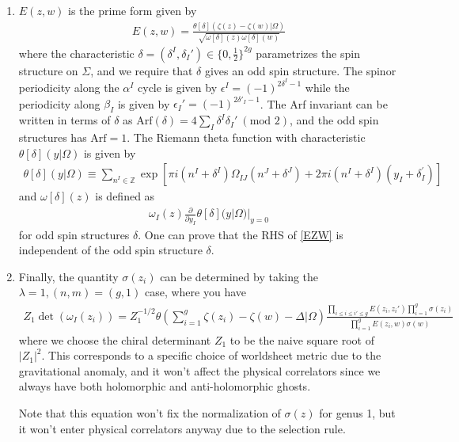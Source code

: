 \documentclass[12pt,letterpaper]{article}
\def\ie{\begin{equation}\begin{aligned}}
\def\fe{\end{aligned}\end{equation}}
\numberwithin{equation}{section}
\begin{document}
\begin{enumerate}
\item[$\bullet$] $E(z,w)$ is the prime form given by
\ie
E(z,w) = \frac{\theta[\delta](\zeta(z)-\zeta(w)|\Omega)}{\sqrt{\omega[\delta](z)\omega[\delta](w)}}
\label{EZW}
\fe
where the characteristic $\delta=(\delta^I, \delta_I')\in \{0,\frac{1}{2}\}^{2g}$ parametrizes the spin structure on $\Sigma$, and we require that $\delta$ gives an odd spin structure. The spinor periodicity along the $\alpha^I$ cycle is given by $\epsilon^I=(-1)^{2\delta^I-1}$ while the periodicity along $\beta_I$ is given by $\epsilon_I'=(-1)^{2\delta'_I-1}$. The Arf invariant can be written in terms of $\delta$ as $\mathrm{Arf}(\delta)=4\sum_{I}\delta^I \delta_I'\ (\text{mod }2)$, and the odd spin structures has $\text{Arf}=1$. The Riemann theta function with characteristic $\theta[\delta](y|\Omega)$ is given by 
\ie
\theta[\delta](y |\Omega) \equiv \sum_{n^I \in \mathbb{Z}} \exp \left[\pi i\left(n^I+\delta^I\right) \Omega_{I J}\left(n^J+\delta^J\right)+2 \pi i\left(n^I+\delta^I\right)\left(y_I+\delta_I^{\prime}\right)\right]
\fe
and $\omega[\delta](z)$ is defined as
\ie
\omega_I(z)\frac{\partial}{\partial y_I}\theta[\delta](y|\Omega)|_{y=0}
\fe
for odd spin structures $\delta$. One can prove that the RHS of \eqref{EZW} is independent of the odd spin structure $\delta$.

\item[$\bullet$]Finally, the quantity $\sigma(z_i)$ can be determined by taking the $\lambda = 1, (n,m)=(g,1)$ case, where you have
\ie
Z_1 \det(\omega_I(z_i)) = Z_1^{-1/2}\theta\left(\sum_{i=1}^g \zeta(z_i)-\zeta(w)-\Delta|\Omega\right) \frac{\prod_{i\leq i\leq i'\leq g}E(z_i, z_i')\prod_{i=1}^g\sigma(z_i)}{\prod_{i=1}^g E(z_i, w)\sigma(w)}
\fe
where we choose the chiral determinant $Z_1$ to be the naive square root of $|Z_1|^2$. This corresponds to a specific choice of worldsheet metric due to the gravitational anomaly, and it won't affect the physical correlators since we always have both holomorphic and anti-holomorphic ghosts.

Note that this equation won't fix the normalization of $\sigma(z)$ for genus 1, but it won't enter physical correlators anyway due to the selection rule.

\end{enumerate}
\end{document}
